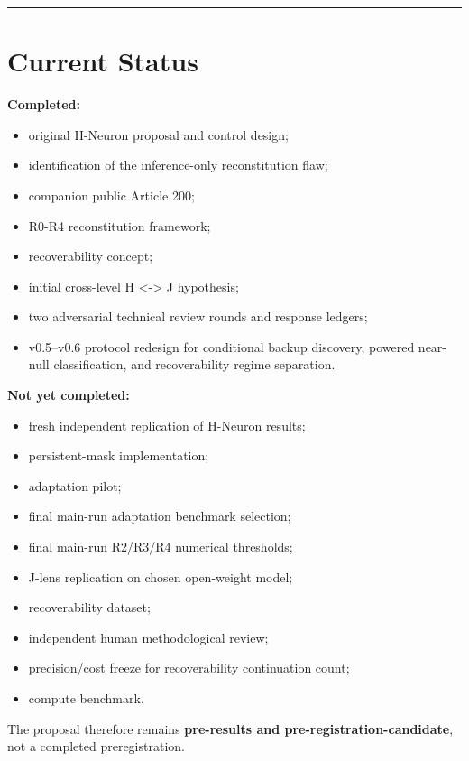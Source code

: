 \begin{center}\rule{0.5\linewidth}{0.5pt}\end{center}

\section{Current Status}\label{current-status}

\textbf{Completed:}

\begin{itemize}
\tightlist
\item
  original H-Neuron proposal and control design;
\item
  identification of the inference-only reconstitution flaw;
\item
  companion public Article 200;
\item
  R0-R4 reconstitution framework;
\item
  recoverability concept;
\item
  initial cross-level H \textless-\textgreater{} J hypothesis;
\item
  two adversarial technical review rounds and response ledgers;
\item
  v0.5--v0.6 protocol redesign for conditional backup discovery, powered near-null classification, and recoverability regime separation.
\end{itemize}

\textbf{Not yet completed:}

\begin{itemize}
\tightlist
\item
  fresh independent replication of H-Neuron results;
\item
  persistent-mask implementation;
\item
  adaptation pilot;
\item
  final main-run adaptation benchmark selection;
\item
  final main-run R2/R3/R4 numerical thresholds;
\item
  J-lens replication on chosen open-weight model;
\item
  recoverability dataset;
\item
  independent human methodological review;
\item
  precision/cost freeze for recoverability continuation count;
\item
  compute benchmark.
\end{itemize}

The proposal therefore remains \textbf{pre-results and pre-registration-candidate}, not a completed preregistration.

